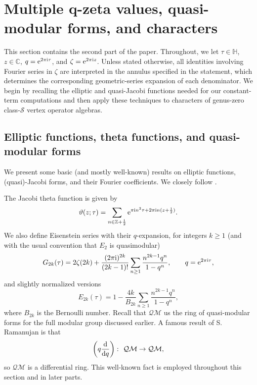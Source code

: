\documentclass[10pt,a4paper]{amsart}
\numberwithin{equation}{section}
\theoremstyle{definition}
\begin{document}
\section[Multiple q-zeta values, quasi-modular forms, and characters]{Multiple $\boldsymbol{q}$-zeta values, quasi-modular forms, and characters}\label{section3}

This section contains the second part of the paper. Throughout, we let
$\tau\in\mathbb H$, $z\in\mathbb C$, $q={\rm e}^{2\pi {\rm i}\tau}$, and
$\zeta={\rm e}^{2\pi {\rm i} z}$.
Unless stated otherwise, all identities involving Fourier series in $\zeta$
are interpreted in the annulus specified in the statement, which determines
the corresponding geometric-series expansion of each denominator. We begin by
recalling the elliptic and quasi-Jacobi functions needed for our constant-term
computations and then apply these techniques to characters of genus-zero
class-$\mathcal{S}$ vertex operator algebras.


\subsection{Elliptic functions, theta functions, and quasi-modular forms}\label{section3.1}
We present some basic (and mostly well-known) results on elliptic functions, (quasi)-Jacobi forms, and their Fourier coefficients. We closely follow \cite{Lang}.

The Jacobi theta function is given by
\[
\vartheta(z;\tau)=\sum_{n \in \mathbb{Z}+\frac12} {\rm e}^{\pi {\rm i} n^2 \tau+2 \pi {\rm i} n(z+\frac12)}.
\]
We also define Eisenstein series with their $q$-expansion, for integers $k\geq1$ (and with the usual convention that $E_2$ is quasimodular)
\[
G_{2k}(\tau)=2 \zeta(2k)+\frac{(2\pi {\rm i})^{2k}}{(2k-1)!} \sum_{n \geq 1} \frac{n^{2k-1}q^n}{1-q^n}, \qquad q={\rm e}^{2 \pi {\rm i} \tau},
\]
and slightly normalized versions
\begin{equation} \label{eis}
E_{2k}(\tau)=1-\frac{4k}{B_{2k}}\sum_{n \geq 1} \frac{n^{2k-1} q^n}{1-q^n},
\end{equation}
where $B_{2k}$ is the Bernoulli number. Recall that $\mathcal{QM}$ us the ring of quasi-modular forms for the full modular group discussed earlier. A famous result of S. Ramanujan is that
\[
\left(q \frac{{\rm d}}{{\rm d}q} \right)\colon \ \mathcal{QM} \rightarrow \mathcal{QM},
\]
so $\mathcal{QM}$ is a differential ring. This well-known fact is employed throughout this section and in later parts.
\end{document}
